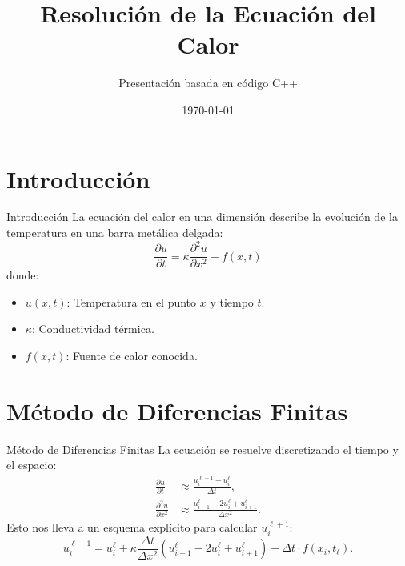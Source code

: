 \documentclass{beamer}
\title{Resolución de la Ecuación del Calor}
\author{Presentación basada en código C++}
\date{\today}
\begin{document}
\frame{\titlepage}

\section{Introducción}
\begin{frame}{Introducción}
    La ecuación del calor en una dimensión describe la evolución de la temperatura en una barra metálica delgada:
    \[
    \frac{\partial u}{\partial t} = \kappa \frac{\partial^2 u}{\partial x^2} + f(x, t)
    \]
    donde:
    \begin{itemize}
        \item \(u(x, t)\): Temperatura en el punto \(x\) y tiempo \(t\).
        \item \(\kappa\): Conductividad térmica.
        \item \(f(x, t)\): Fuente de calor conocida.
    \end{itemize}
\end{frame}

\section{Método de Diferencias Finitas}
\begin{frame}{Método de Diferencias Finitas}
    La ecuación se resuelve discretizando el tiempo y el espacio:
    \begin{align*}
        \frac{\partial u}{\partial t} &\approx \frac{u_i^{\ell+1} - u_i^\ell}{\Delta t}, \\
        \frac{\partial^2 u}{\partial x^2} &\approx \frac{u_{i-1}^\ell - 2u_i^\ell + u_{i+1}^\ell}{\Delta x^2}.
    \end{align*}
    Esto nos lleva a un esquema explícito para calcular \(u_i^{\ell+1}\):
    \[
    u_i^{\ell+1} = u_i^\ell + \kappa \frac{\Delta t}{\Delta x^2}(u_{i-1}^\ell - 2u_i^\ell + u_{i+1}^\ell) + \Delta t \cdot f(x_i, t_\ell).
    \]
\end{frame}
\end{document}
